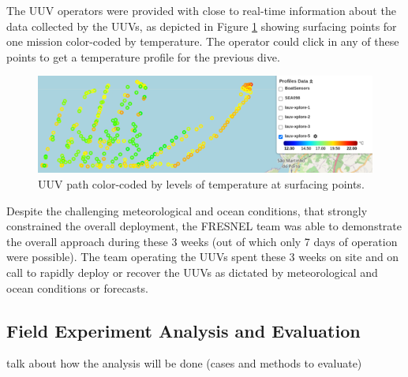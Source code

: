 The UUV operators were provided with close to real-time information about the data collected by the UUVs, as depicted in Figure \ref{fig:temperatureprofiles} showing surfacing points for one mission color-coded by temperature. The operator could click in any of these points to get a temperature profile for the previous dive.

 \begin{figure}
    \centering
    \includegraphics[width=.7\linewidth]{fig/temperatureprofiles.png}
    \caption{UUV path color-coded by levels of temperature at surfacing points.}
    \label{fig:temperatureprofiles}
\end{figure}



Despite the challenging meteorological and ocean conditions, that strongly constrained the overall deployment, the FRESNEL team was able to demonstrate the overall approach during these 3 weeks (out of which only 7 days of operation were possible). The team operating the UUVs spent these 3 weeks on site and on call to rapidly deploy or recover the UUVs as dictated by meteorological and ocean conditions or forecasts. 



\subsection{Field Experiment Analysis and Evaluation}

talk about how the analysis will be done (cases and methods to evaluate)



    

